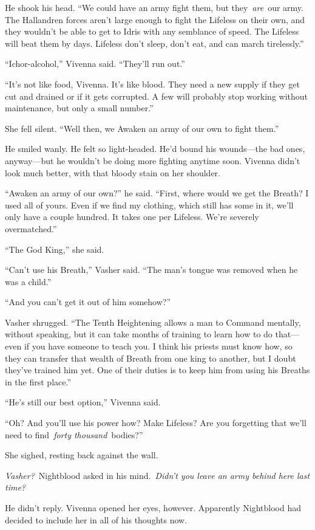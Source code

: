 He shook his head. “We could have an army fight them, but they~\textit{are}~our army. The Hallandren forces aren’t large enough to fight the Lifeless on their own, and they wouldn’t be able to get to Idris with any semblance of speed. The Lifeless will beat them by days. Lifeless don’t sleep, don’t eat, and can march tirelessly.”

“Ichor-alcohol,” Vivenna said. “They’ll run out.”

“It’s not like food, Vivenna. It’s like blood. They need a new supply if they get cut and drained or if it gets corrupted. A few will probably stop working without maintenance, but only a small number.”

She fell silent. “Well then, we Awaken an army of our own to fight them.”

He smiled wanly. He felt so light-headed. He’d bound his wounds—the bad ones, anyway—but he wouldn’t be doing more fighting anytime soon. Vivenna didn’t look much better, with that bloody stain on her shoulder.

“Awaken an army of our own?” he said. “First, where would we get the Breath? I used all of yours. Even if we find my clothing, which still has some in it, we’ll only have a couple hundred. It takes one per Lifeless. We’re severely overmatched.”

“The God King,” she said.

“Can’t use his Breath,” Vasher said. “The man’s tongue was removed when he was a child.”

“And you can’t get it out of him somehow?”

Vasher shrugged. “The Tenth Heightening allows a man to Command mentally, without speaking, but it can take months of training to learn how to do that—even if you have someone to teach you. I think his priests must know how, so they can transfer that wealth of Breath from one king to another, but I doubt they’ve trained him yet. One of their duties is to keep him from using his Breaths in the first place.”

“He’s still our best option,” Vivenna said.

“Oh? And you’ll use his power how? Make Lifeless? Are you forgetting that we’ll need to find~\textit{forty thousand}~bodies?”

She sighed, resting back against the wall.

\textit{Vasher?}~Nightblood asked in his mind.~\textit{Didn’t you leave an army behind here last time?}

He didn’t reply. Vivenna opened her eyes, however. Apparently Nightblood had decided to include her in all of his thoughts now.

